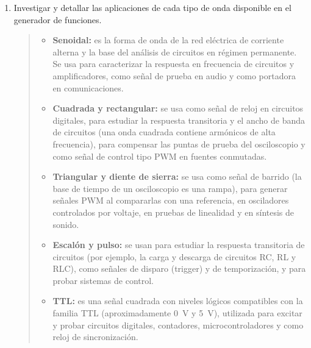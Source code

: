 \documentclass{article}
\begin{document}
\begin{enumerate}
\begin{enumerate}[label=\alph*)]
\begin{quote}
                Aun así, sí es posible leer el voltaje pico a pico (diferencia entre el máximo y el mínimo observados, que como mucho es la suma de los picos de ambas señales) y, cuando la señal es periódica, el período a partir de la repetición de la forma. Sin embargo, esos valores ya no corresponden a una única frecuencia ni a una amplitud senoidal, y su identificación es más difícil, sobre todo cuando las frecuencias son muy distintas o su cociente no es simple.
            \end{quote}
        \end{enumerate}

        \item Investigar y detallar las aplicaciones de cada tipo de onda disponible en el generador de funciones.

        \begin{quote}
            \begin{itemize}
                \item \textbf{Senoidal:} es la forma de onda de la red eléctrica de corriente alterna y la base del análisis de circuitos en régimen permanente. Se usa para caracterizar la respuesta en frecuencia de circuitos y amplificadores, como señal de prueba en audio y como portadora en comunicaciones.
                \item \textbf{Cuadrada y rectangular:} se usa como señal de reloj en circuitos digitales, para estudiar la respuesta transitoria y el ancho de banda de circuitos (una onda cuadrada contiene armónicos de alta frecuencia), para compensar las puntas de prueba del osciloscopio y como señal de control tipo PWM en fuentes conmutadas.
                \item \textbf{Triangular y diente de sierra:} se usa como señal de barrido (la base de tiempo de un osciloscopio es una rampa), para generar señales PWM al compararlas con una referencia, en osciladores controlados por voltaje, en pruebas de linealidad y en síntesis de sonido.
                \item \textbf{Escalón y pulso:} se usan para estudiar la respuesta transitoria de circuitos (por ejemplo, la carga y descarga de circuitos RC, RL y RLC), como señales de disparo (trigger) y de temporización, y para probar sistemas de control.
                \item \textbf{TTL:} es una señal cuadrada con niveles lógicos compatibles con la familia TTL (aproximadamente \SI{0}{\volt} y \SI{5}{\volt}), utilizada para excitar y probar circuitos digitales, contadores, microcontroladores y como reloj de sincronización.
            \end{itemize}
        \end{quote}


\end{enumerate}
\end{document}
